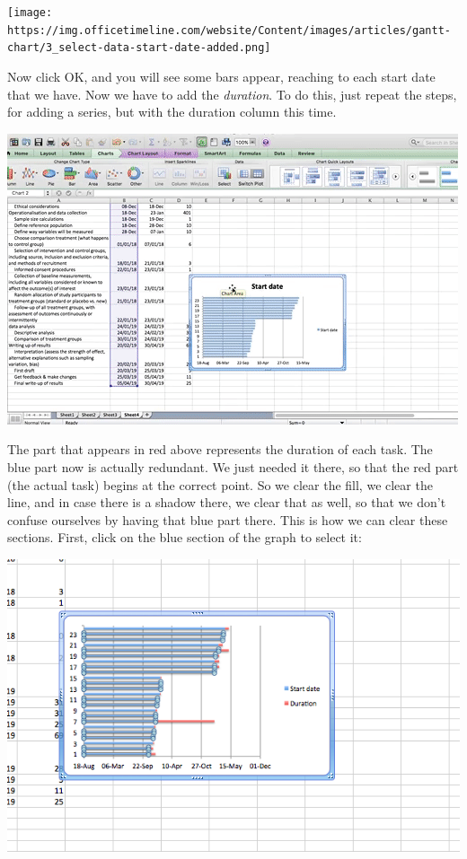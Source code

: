 \documentclass[
]{book}
\begin{document}
\texttt{[image: https://img.officetimeline.com/website/Content/images/articles/gantt-chart/3\_select-data-start-date-added.png]}

Now click OK, and you will see some bars appear, reaching to each start date that we have. Now we have to add the \emph{duration}. To do this, just repeat the steps, for adding a series, but with the duration column this time.

\includegraphics{imgs/gantt_select_data_2.gif}

The part that appears in red above represents the duration of each task. The blue part now is actually redundant. We just needed it there, so that the red part (the actual task) begins at the correct point. So we clear the fill, we clear the line, and in case there is a shadow there, we clear that as well, so that we don't confuse ourselves by having that blue part there. This is how we can clear these sections. First, click on the blue section of the graph to select it:

\includegraphics{imgs/gantt_select_blue.png}
\end{document}
